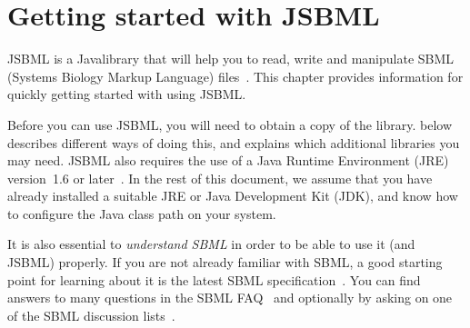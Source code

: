 \documentclass{JSBMLdoc}
\begin{document}


\maketitlepage
\maketableofcontents
\clearpage


\chapter{Getting started with JSBML}
\label{chp:getting-started}

JSBML is a Java\TTra library that will help you to read, write and
manipulate SBML (Systems Biology Markup Language)
files~\cite{Draeger2011a, Draeger2011b}. This chapter provides
information for quickly getting started with using JSBML.

Before you can use JSBML, you will need to obtain a copy of the library.
 below describes different ways of doing
this, and explains which additional libraries you may need. JSBML also
requires the use of a Java Runtime Environment (JRE) version~1.6 or
later~\cite{JavaDownloadURL}.  In the
rest of this document, we assume that you have already installed a suitable
JRE or Java Development Kit (JDK), and know how to configure the Java class
path on your system. 

It is also essential to \emph{understand SBML} in order to be able to use
it (and JSBML) properly. If you are not already familiar with SBML, a good
starting point for learning about it is the latest SBML
specification~\cite{SBMLspecs}. You can find answers to many questions in
the SBML FAQ~\cite{SBMLFAQ} and optionally by asking on one of the SBML
discussion lists~\cite{SBMLforums}.
\end{document}
